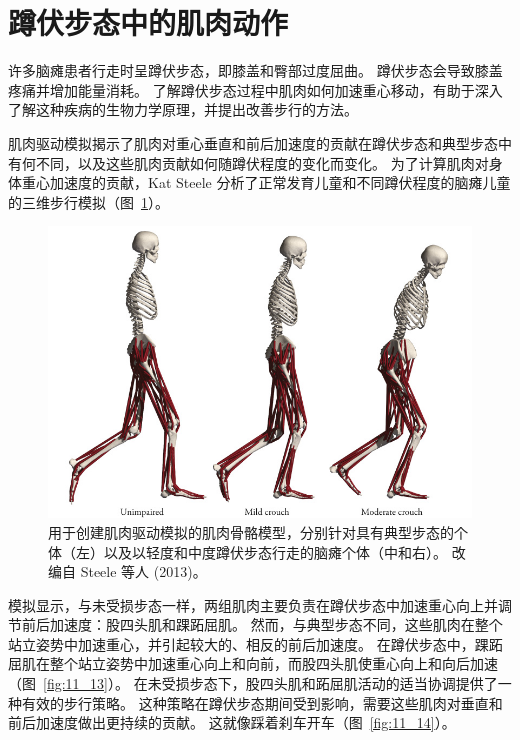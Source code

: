 \section{蹲伏步态中的肌肉动作}

许多脑瘫患者行走时呈蹲伏步态，即膝盖和臀部过度屈曲。
蹲伏步态会导致膝盖疼痛并增加能量消耗。
了解蹲伏步态过程中肌肉如何加速重心移动，有助于深入了解这种疾病的生物力学原理，并提出改善步行的方法。


肌肉驱动模拟揭示了肌肉对重心垂直和前后加速度的贡献在蹲伏步态和典型步态中有何不同，以及这些肌肉贡献如何随蹲伏程度的变化而变化。
为了计算肌肉对身体重心加速度的贡献，Kat Steele 分析了正常发育儿童和不同蹲伏程度的脑瘫儿童的三维步行模拟（图~\ref{fig:11_12}）。


\begin{figure}[!htb]
	\centering
	\includegraphics[width=1.0\linewidth]{chap11/11_12}
	\caption{用于创建肌肉驱动模拟的肌肉骨骼模型，分别针对具有典型步态的个体（左）以及以轻度和中度蹲伏步态行走的脑瘫个体（中和右）。
		改编自 Steele 等人 (2013)。 \label{fig:11_12}}
\end{figure}


模拟显示，与未受损步态一样，两组肌肉主要负责在蹲伏步态中加速重心向上并调节前后加速度：股四头肌和踝跖屈肌。
然而，与典型步态不同，这些肌肉在整个站立姿势中加速重心，并引起较大的、相反的前后加速度。
在蹲伏步态中，踝跖屈肌在整个站立姿势中加速重心向上和向前，而股四头肌使重心向上和向后加速（图~\ref{fig:11_13}）。
在未受损步态下，股四头肌和跖屈肌活动的适当协调提供了一种有效的步行策略。
这种策略在蹲伏步态期间受到影响，需要这些肌肉对垂直和前后加速度做出更持续的贡献。
这就像踩着刹车开车（图~\ref{fig:11_14}）。


